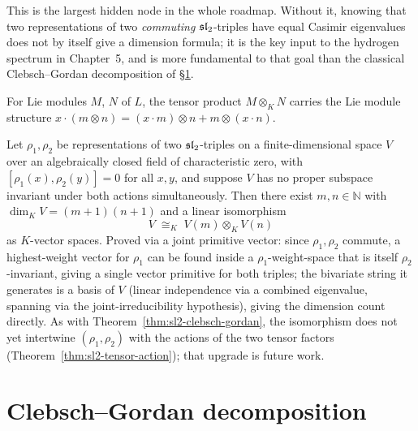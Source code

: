 This is the largest hidden node in the whole roadmap. Without it, knowing
that two representations of two \emph{commuting} $\mathfrak{sl}_2$-triples have equal
Casimir eigenvalues does not by itself give a dimension formula; it is the
key input to the hydrogen spectrum in Chapter~5, and is more fundamental to
that goal than the classical Clebsch--Gordan decomposition of
\S\ref{sec:sl2-cg}.

\begin{theorem}
  \label{thm:sl2-tensor-action}
  \mathlibok
  For Lie modules $M$, $N$ of $L$, the tensor product $M \otimes_K N$ carries
  the Lie module structure $x \cdot (m \otimes n) = (x\cdot m)\otimes n +
  m \otimes (x \cdot n)$.
\end{theorem}

\begin{theorem}
  \label{thm:sl2-commuting-classification}
  \leanok
  Let $\rho_1, \rho_2$ be representations of two $\mathfrak{sl}_2$-triples on a
  finite-dimensional space $V$ over an algebraically closed field of
  characteristic zero, with $[\rho_1(x), \rho_2(y)] = 0$ for all $x, y$, and
  suppose $V$ has no proper subspace invariant under both actions
  simultaneously. Then there exist $m, n \in \mathbb{N}$ with
  $\dim_K V = (m+1)(n+1)$ and a linear isomorphism
  \[
    V \;\cong_K\; V(m) \otimes_K V(n)
  \]
  as $K$-vector spaces. Proved via a joint primitive vector: since $\rho_1,
  \rho_2$ commute, a highest-weight vector for $\rho_1$ can be found inside a
  $\rho_1$-weight-space that is itself $\rho_2$-invariant, giving a single
  vector primitive for both triples; the bivariate string it generates is a
  basis of $V$ (linear independence via a combined eigenvalue, spanning via
  the joint-irreducibility hypothesis), giving the dimension count directly.
  As with Theorem~\ref{thm:sl2-clebsch-gordan}, the isomorphism does not yet
  intertwine $(\rho_1,\rho_2)$ with the actions of the two tensor factors
  (Theorem~\ref{thm:sl2-tensor-action}); that upgrade is future work.
\end{theorem}

\section{Clebsch--Gordan decomposition}
\label{sec:sl2-cg}

